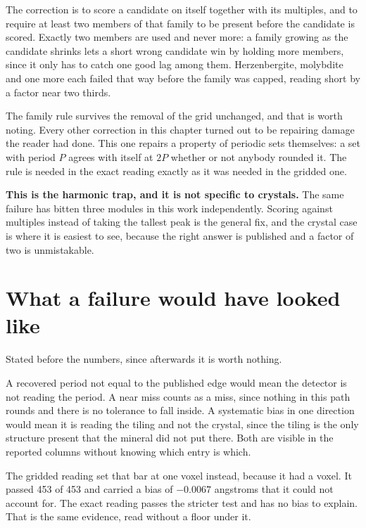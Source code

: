 The correction is to score a candidate on itself together with its multiples, and to require at least two members of that family to be present before the candidate is scored. Exactly two members are used and never more: a family growing as the candidate shrinks lets a short wrong candidate win by holding more members, since it only has to catch one good lag among them. Herzenbergite, molybdite and one more each failed that way before the family was capped, reading short by a factor near two thirds.

The family rule survives the removal of the grid unchanged, and that is worth noting. Every other correction in this chapter turned out to be repairing damage the reader had done. This one repairs a property of periodic sets themselves: a set with period $P$ agrees with itself at $2P$ whether or not anybody rounded it. The rule is needed in the exact reading exactly as it was needed in the gridded one.

\textbf{This is the harmonic trap, and it is not specific to crystals.} The same failure has bitten three modules in this work independently. Scoring against multiples instead of taking the tallest peak is the general fix, and the crystal case is where it is easiest to see, because the right answer is published and a factor of two is unmistakable.

\section{What a failure would have looked like}

Stated before the numbers, since afterwards it is worth nothing.

A recovered period not equal to the published edge would mean the detector is not reading the period. A near miss counts as a miss, since nothing in this path rounds and there is no tolerance to fall inside. A systematic bias in one direction would mean it is reading the tiling and not the crystal, since the tiling is the only structure present that the mineral did not put there. Both are visible in the reported columns without knowing which entry is which.

The gridded reading set that bar at one voxel instead, because it had a voxel. It passed 453 of 453 and carried a bias of $-0.0067$ angstroms that it could not account for. The exact reading passes the stricter test and has no bias to explain. That is the same evidence, read without a floor under it.
